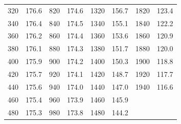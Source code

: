 \documentclass[a4paper]{scrartcl}
\begin{document}
\begin{table}[htb]
\begin{tabular}{c|c||c|c||c|c||c|c}
		320	&	176.6	&	820	&	174.6	&	1320	&	156.7	&	1820	&	123.4	\\
		340	&	176.4	&	840	&	174.5	&	1340	&	155.1	&	1840	&	122.2	\\
		360	&	176.2	&	860	&	174.4	&	1360	&	153.6	&	1860	&	120.9	\\
		380	&	176.1	&	880	&	174.3	&	1380	&	151.7	&	1880	&	120.0	\\
		400	&	175.9	&	900	&	174.2	&	1400	&	150.3	&	1900	&	118.8	\\
		420	&	175.7	&	920	&	174.1	&	1420	&	148.7	&	1920	&	117.7	\\
		440	&	175.6	&	940	&	174.0	&	1440	&	147.0	&	\cellcolor{yellow}1940	&	\cellcolor{yellow}116.6	\\
		460	&	175.4	&	960	&	173.9	&	1460	&	145.9	&		&		\\
		480	&	175.3	&	980	&	173.8	&	1480	&	144.2	&		&	\\
		\hline\hline
	\end{tabular}
\end{table}
\end{document}

